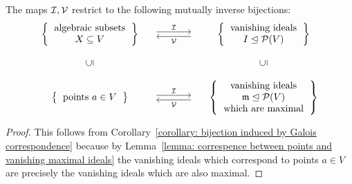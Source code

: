 \begin{corollary}
  \label{corollary: general correspondence for algebraic subsets and points}
  The maps $\mathcal{I}, \mathcal{V}$ restrict to the following mutually inverse bijections:
  \[
    \begin{matrix}
        \left\{
          \begin{tabular}{c}
              algebraic subsets \\
              $X \subseteq V$
          \end{tabular}
        \right\}
      & \begin{tikzcd}[column sep = large]
            {}
            \arrow[shift left]{r}{\mc{I}}
          & {}
            \arrow[shift left]{l}{\mc{V}}
        \end{tikzcd}
      & \left\{
          \begin{tabular}{c}
            vanishing ideals \\
            $I \idealeq \mc{P}(V)$
          \end{tabular}
        \right\}
      \\
        {}
      & {}
      & {}
      \\
        \rotatebox[origin=c]{90}{$\subseteq$}
      & {}
      & \rotatebox[origin=c]{90}{$\subseteq$}
      \\
        {}
      & {}
      & {}
      \\
        \left\{
          \begin{tabular}{c}
            points $a \in V$
          \end{tabular}
        \right\}
      & \begin{tikzcd}[column sep = large]
            {}
            \arrow[shift left]{r}{\mc{I}}
          & {}
            \arrow[shift left]{l}{\mc{V}}
        \end{tikzcd}
      & \left\{
          \begin{tabular}{c}
            vanishing ideals \\
            $\mf{m} \idealeq \mc{P}(V)$ \\
            which are maximal
          \end{tabular}
        \right\}
    \end{matrix}
  \]
\end{corollary}


\begin{proof}
  This follows from Corollary~\ref{corollary: bijection induced by Galois correspondence} because by Lemma~\ref{lemma: correspence between points and vanishing maximal ideals} the vanishing ideals which correspond to points $a \in V$ are precisely the vanishing ideals which are also maximal.
\end{proof}


